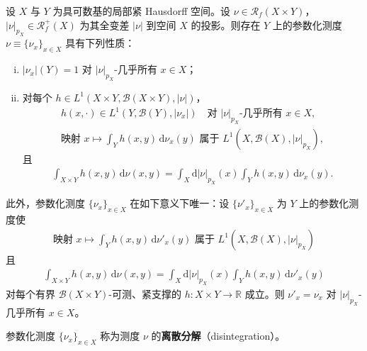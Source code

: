 \documentclass[../../main.tex]{subfiles}%
\begin{document}
\begin{theorem}[离散分解]\label{theorem:ch05-离散分解}
设 $X$ 与 $Y$ 为具可数基的局部紧 Hausdorff 空间。设 $\nu\in\mathscr{R}_f(X\times Y)$，$|\nu|_{p_X}\in\mathscr{R}^+_f(X)$ 为其全变差 $|\nu|$ 到空间 $X$ 的投影。则存在 $Y$ 上的参数化测度 $\nu\equiv\{\nu_x\}_{x\in X}$ 具有下列性质：
\begin{enumerate}[(i)]
\item\label{item:ch05-dis-i} $|\nu_x|(Y)=1$ 对 $|\nu|_{p_X}$-几乎所有 $x\in X$；
\item\label{item:ch05-dis-ii} 对每个 $h\in L^1(X\times Y,\mathscr{B}(X\times Y),|\nu|)$，
\begin{align}
h(x,\cdot)\in L^1(Y,\mathscr{B}(Y),|\nu_x|)
\quad\text{对 }|\nu|_{p_X}\text{-几乎所有 }x\in X,\label{align:ch05-5.34}\\
\text{映射 }x\mapsto\int_Y h(x,y)\,\mathrm{d}\nu_x(y)
\text{ 属于 }L^1(X,\mathscr{B}(X),|\nu|_{p_X}),\label{align:ch05-5.35}
\end{align}
且
\begin{align}
\int_{X\times Y}h(x,y)\,\mathrm{d}\nu(x,y)
=\int_X\mathrm{d}|\nu|_{p_X}(x)\int_Y h(x,y)\,\mathrm{d}\nu_x(y).\label{align:ch05-5.36}
\end{align}
\end{enumerate}
此外，参数化测度 $\{\nu_x\}_{x\in X}$ 在如下意义下唯一：设 $\{\nu'_x\}_{x\in X}$ 为 $Y$ 上的参数化测度使
\begin{align}
\text{映射 }x\mapsto\int_Y h(x,y)\,\mathrm{d}\nu'_x(y)
\text{ 属于 }L^1(X,\mathscr{B}(X),|\nu|_{p_X})\label{align:ch05-5.37}
\end{align}
且
\begin{align}
\int_{X\times Y}h(x,y)\,\mathrm{d}\nu(x,y)
=\int_X\mathrm{d}|\nu|_{p_X}(x)\int_Y h(x,y)\,\mathrm{d}\nu'_x(y)\label{align:ch05-5.38}
\end{align}
对每个有界 $\mathscr{B}(X\times Y)$-可测、紧支撑的 $h:X\times Y\to\mathbb{R}$ 成立。则 $\nu'_x=\nu_x$ 对 $|\nu|_{p_X}$-几乎所有 $x\in X$。
\end{theorem}

\begin{definition}\label{definition:ch05-离散分解定义}
参数化测度 $\{\nu_x\}_{x\in X}$ 称为测度 $\nu$ 的\textbf{离散分解}（disintegration）。
\end{definition}
\end{document}
